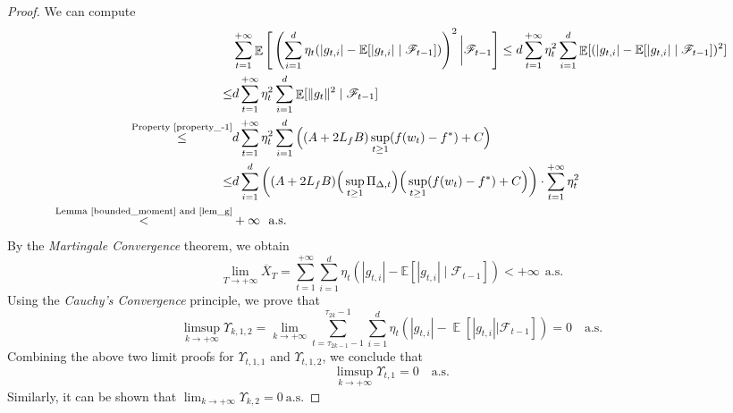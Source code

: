\documentclass{article} %
\DeclareMathOperator{\Expect}{\mathbb{E}}
\begin{document}
\begin{proof}
We can compute
\begin{align*}
 &\sum_{t=1}^{+\infty} \Expect\Bigg[\left( \sum_{i=1}^{d} \eta_{t} (|g_{t,i}| - \mathbb{E}[|g_{t,i}| \mid \mathscr{F}_{t-1}]) \right)^{2}\bigg|\mathscr{F}_{t-1}\Bigg]\le d\sum_{t=1}^{+\infty}\eta^{2}_{t}\sum_{i=1}^{d} \Expect[(|g_{t,i}| - \mathbb{E}[|g_{t,i}| \mid \mathscr{F}_{t-1}])^{2} ]\\
 \le& d\sum_{t=1}^{+\infty}\eta^{2}_{t}\sum_{i=1}^{d} \Expect[\|g_{t}\|^{2} \mid \mathscr{F}_{t-1}] \\
 \mathop{\le}^{\text{Property \ref{property_-1}}}& d\sum_{t=1}^{+\infty}\eta^{2}_{t}\sum_{i=1}^{d}\Big( (A+2L_{f}B)\sup_{t\ge 1}(f(w_{t})-f^*)+C\Big)\\ 
 \le & d\sum_{i=1}^{d}\bigg( (A+2L_{f}B)\Big(\sup_{t\ge 1}\Pi_{\Delta,t}\Big)\Big(\sup_{t\ge 1}(f(w_{t})-f^*)+C\Big)\bigg)\cdot\sum_{t=1}^{+\infty}\eta^{2}_{t}\\\mathop{<}^{\text{Lemma \ref{bounded_moment} and \ref{lem_g}}} & +\infty\ \ \text{a.s.}
\end{align*}
By the \emph{Martingale Convergence} theorem, we obtain
\[\lim_{T \to +\infty} \overline{X}_{T} = \sum_{t=1}^{+\infty} \sum_{i=1}^{d} \eta_{t} (|g_{t,i}| - \mathbb{E}[|g_{t,i}| \mid \mathscr{F}_{t-1}]) < +\infty\ \ \text{a.s.}\]
Using the \emph{Cauchy's Convergence} principle, we prove that
\[\limsup_{k \to +\infty} \Upsilon_{k,1,2} = 
\lim_{k\rightarrow+\infty}\sum_{t=\tau_{2k-1}-1}^{\tau_{2k}-1}\sum_{i=1}^{d}{\eta_{t}(|g_{t,i}|-\Expect[|g_{t,i}||\mathscr{F}_{t-1}])} = 0 \quad \text{a.s.}\]
Combining the above two limit proofs for $\Upsilon_{t,1,1}$ and $\Upsilon_{t,1,2}$, we conclude that
\[\limsup_{k \to +\infty} \Upsilon_{t,1} = 0 \quad \text{a.s.}\]
Similarly, it can be shown that $\lim_{k \to +\infty} \Upsilon_{k,2} = 0 \ \text{a.s.}$ %

\end{proof}
\end{document}
